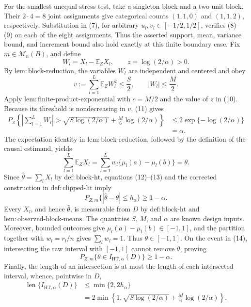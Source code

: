 For the smallest unequal stress test, take a singleton block and a two-unit block. Their \(2\cdot4=8\) joint assignments give categorical counts \((1,1,0)\) and \((1,1,2)\), respectively. Substitution in (7), for arbitrary \(u_l,v_l\in[-1/2,1/2]\), verifies (8)--(9) on each of the eight assignments. Thus the asserted support, mean, variance bound, and increment bound also hold exactly at this finite boundary case.
Fix \(m\in\mathcal M_n(B)\), and define
\[
 W_l=X_l-\mathbb E_ZX_l,\qquad z=\log(2/\alpha)>0.
\tag{10}
\]
By \(\mathrm{lem{:}block\text{-}reduction}\), the variables \(W_l\) are independent and centered and obey
\[
 v:=\sum_{l=1}^L\mathbb E_ZW_l^2\le\frac S2,
 \qquad |W_l|\le\frac M2.
\tag{11}
\]
Apply \(\mathrm{lem{:}finite\text{-}product\text{-}exponential}\) with \(c=M/2\) and the value of \(z\) in (10). Because its threshold is nondecreasing in \(v\), (11) gives
\[
\begin{aligned}
 P_Z\!\left\{\left|\sum_{l=1}^LW_l\right|>
 \sqrt{S\log(2/\alpha)}+\frac M6\log(2/\alpha)\right\}
 &\le2\exp\{-\log(2/\alpha)\}\\
 &=\alpha.
\end{aligned}
\tag{12}
\]
The expectation identity in \(\mathrm{lem{:}block\text{-}reduction}\), followed by the definition of the causal estimand, yields
\[
 \sum_{l=1}^L\mathbb E_ZX_l
 =\sum_{l=1}^Lw_l\{\mu_l(a)-\mu_l(b)\}=\theta.
\tag{13}
\]
Since \(\widehat\theta=\sum_lX_l\) by \(\mathrm{def{:}block\text{-}ht}\), equations (12)--(13) and the corrected construction in \(\mathrm{def{:}clipped\text{-}ht}\) imply
\[
 P_{Z,m}\{|\widehat\theta-\theta|\le h_\alpha\}\ge1-\alpha.
\tag{14}
\]
Every \(X_l\), and hence \(\widehat\theta\), is measurable from \(D\) by \(\mathrm{def{:}block\text{-}ht}\) and \(\mathrm{lem{:}observed\text{-}block\text{-}means}\). The quantities \(S\), \(M\), and \(\alpha\) are known design inputs. Moreover, bounded outcomes give \(\mu_l(a)-\mu_l(b)\in[-1,1]\), and the partition together with \(w_l=r_l/n\) gives \(\sum_lw_l=1\). Thus \(\theta\in[-1,1]\). On the event in (14), intersecting the raw interval with \([-1,1]\) cannot remove \(\theta\), proving
\[
 P_{Z,m}\{\theta\in I_{\mathrm{HT},\alpha}(D)\}\ge1-\alpha.
\tag{15}
\]
Finally, the length of an intersection is at most the length of each intersected interval, whence, pointwise in \(D\),
\[
\begin{aligned}
 \operatorname{len}\{I_{\mathrm{HT},\alpha}(D)\}
 &\le\min\{2,2h_\alpha\}\\
 &=2\min\!\left\{1,\sqrt{S\log(2/\alpha)}
       +\frac M6\log(2/\alpha)\right\}.
\end{aligned}
\tag{16}
\]
